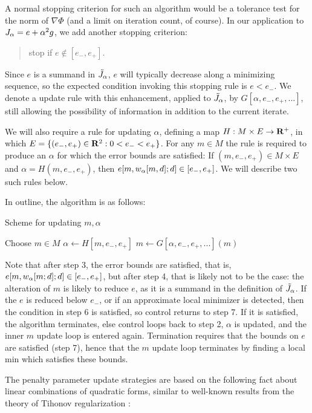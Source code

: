 A normal stopping criterion for such an algorithm would be a tolerance
test for the norm of $\nabla \Phi$ (and a limit on iteration count, of
course). In our application to $J_{\alpha} = e + \alpha^2 g$, we add another
stopping criterion:
\begin{quote}
  stop if $e \notin [e_-,e_+]$.
\end{quote}
Since $e$ is a summand in $\tilde{J}_{\alpha}$, $e$ will typically decrease along a
minimizing sequence, so the expected condition invoking this stopping
rule is $e<e_-$. We denote a update rule with this enhancement,
applied to $\tilde{J}_{\alpha}$, by $G[\alpha,e_-,e_+,...]$, still allowing the
possibility of information in addition to the current iterate.

We will also require a rule for updating $\alpha$, defining a map $H: M \times E
\rightarrow {\bf R}^+$, in which $E=\{(e_-,e_+) \in {\bf R}^2: 0 < 
e_-<e_+\}$. For any $m \in M$ the rule is required to produce an $\alpha$ for which
the error bounds are satisfied: If $(m, e_-, e_+) \in M \times E$ and $\alpha = H(m, e_-,
e_+)$, then $e[m,w_{\alpha}[m,d];d] \in [e_-,e_+]$. We will describe two
such rules below.

In outline, the algorithm is as follows:
\begin{algorithm}[H]
\caption{Scheme for updating $m, \alpha$}
\begin{algorithmic}[1]
  \State Choose $m\in M$
  \Repeat
  \State $\alpha \gets H[m,e_-,e_+]$
  \Repeat
  \State $m \gets G[\alpha,e_-,e_+,...](m)$
\end{algorithmic}
\end{algorithm}
Note that after step 3, the error bounds are satisfied, that is,
$e[m,w_{\alpha}[m;d];d] \in [e_-,e_+]$, but after step 4, that is likely not
to be the case: the alteration of $m$ is likely to reduce $e$, as it is a
summand in the definition of $\tilde{J}_{\alpha}$. If the $e$ is reduced below
$e_-$, or if an approximate local minimizer is detected, then the condition in step 6 is satisfied, so control returns
to step 7. If it is satisfied, the algorithm terminates, else
control loops back to step 2, $\alpha$ is updated, and the inner $m$
update loop is entered again. Termination requires that the bounds on
$e$ are satisfied (step 7), hence that the $m$ update loop terminates
by finding a local min which satisfies these bounds. 

The penalty parameter update strategies are based on the following fact about linear combinations of quadratic forms, similar to well-known results from the theory of Tihonov regularization \cite[]{Hanke:17}:


